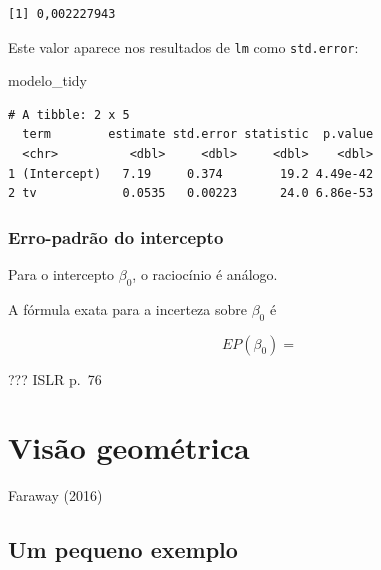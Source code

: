 \documentclass[
  letterpaper,
  DIV=11,
  numbers=noendperiod]{scrreprt}
\newenvironment{Shaded}{\begin{snugshade}}{\end{snugshade}}
\newcommand{\NormalTok}[1]{\textcolor[rgb]{0.00,0.23,0.31}{#1}}
\begin{document}
\begin{verbatim}
[1] 0,002227943
\end{verbatim}

Este valor aparece nos resultados de \texttt{lm} como
\texttt{std.error}:

\begin{Shaded}
\begin{Highlighting}[]
\NormalTok{modelo\_tidy}
\end{Highlighting}
\end{Shaded}

\begin{verbatim}
# A tibble: 2 x 5
  term        estimate std.error statistic  p.value
  <chr>          <dbl>     <dbl>     <dbl>    <dbl>
1 (Intercept)   7.19     0.374        19.2 4.49e-42
2 tv            0.0535   0.00223      24.0 6.86e-53
\end{verbatim}

\subsubsection{Erro-padrão do
intercepto}\label{erro-padruxe3o-do-intercepto}

\begin{tcolorbox}[enhanced jigsaw, opacitybacktitle=0.6, titlerule=0mm, coltitle=black, bottomtitle=1mm, left=2mm, opacityback=0, bottomrule=.15mm, colframe=quarto-callout-important-color-frame, arc=.35mm, title=\textcolor{quarto-callout-important-color}{\faExclamation}\hspace{0.5em}{Erro-padrão de $\beta_0$}, toprule=.15mm, colbacktitle=quarto-callout-important-color!10!white, toptitle=1mm, rightrule=.15mm, leftrule=.75mm, colback=white, breakable]

Para o intercepto $\beta_0$, o raciocínio é análogo.

A fórmula exata para a incerteza sobre $\beta_0$ é

\[
EP(\beta_0) = 
\]

\end{tcolorbox}

??? ISLR p.~76

\section{Visão geométrica}\label{visuxe3o-geomuxe9trica}

Faraway (2016)

\subsection{Um pequeno exemplo}\label{um-pequeno-exemplo}
\end{document}
